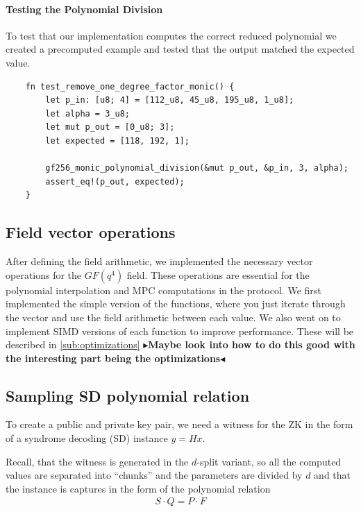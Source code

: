 \documentclass[11pt]{report}
\theoremstyle{definition}
\theoremstyle{plain}
\newcommand{\todo}[1]{{\color[rgb]{.5,0,0}\textbf{$\blacktriangleright$#1$\blacktriangleleft$}}}
\begin{document}
\paragraph{Testing the Polynomial Division}
To test that our implementation computes the correct reduced polynomial we created a precomputed example and tested that the output matched the expected value.
\begin{verbatim}
    fn test_remove_one_degree_factor_monic() {
        let p_in: [u8; 4] = [112_u8, 45_u8, 195_u8, 1_u8];
        let alpha = 3_u8;
        let mut p_out = [0_u8; 3];
        let expected = [118, 192, 1];

        gf256_monic_polynomial_division(&mut p_out, &p_in, 3, alpha);
        assert_eq!(p_out, expected);
    }
\end{verbatim}

\subsection{Field vector operations}\label{sub:field_vector_operations} %
After defining the field arithmetic, we implemented the necessary vector operations for the $GF(q^4)$ field. These operations are essential for the polynomial interpolation and MPC computations in the protocol.
We first implemented the simple version of the functions, where you just iterate through the vector and use the field arithmetic between each value. We also went on to implement SIMD versions of each function to improve performance. These will be described in \autoref{sub:optimizations}
\todo{Maybe look into how to do this good with the interesting part being the optimizations}

\subsection{Sampling SD polynomial relation}\label{sub:witness_generation}

To create a public and private key pair, we need a witness for the ZK in the form of a syndrome decoding (SD) instance $y = Hx$.

Recall, that the witness is generated in the $d$-split variant, so all the computed values are separated into ``chunks'' and the parameters are divided by $d$ and that the instance is captures in the form of the polynomial relation
\begin{align*}
  S\cdot Q = P\cdot F
\end{align*}
\end{document}
